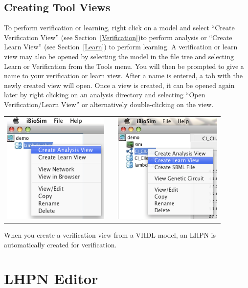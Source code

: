\documentclass[titlepage,11pt]{article}
\begin{document}
\subsection{Creating Tool Views}

\noindent
To perform verification or learning, right click on a model and
select ``Create Verification View'' (see Section~\ref{Verification})to perform
analysis or ``Create Learn View'' (see Section~\ref{Learn})
to perform learning. A verification or learn view may also be opened by
selecting the model in the file tree and selecting Learn or Verification from
the Tools menu.  You will then be prompted to give a name to
your verification or learn view. After a name is entered, a tab with
the newly created view will open. Once a view is created, it can
be opened again later by right clicking on an analysis directory
and selecting ``Open Verification/Learn View'' or alternatively
double-clicking on the view.
\begin{center}
\begin{tabular}{ccc}
\includegraphics[height=55mm]{screenshots/createAnalysis} & & 
\includegraphics[height=55mm]{screenshots/createLearn}
\end{tabular}
\end{center}

When you create a verification view from a VHDL model, an LHPN is
automatically created for verification.

\section{\label{LHPNEdit}LHPN Editor}
\end{document}
